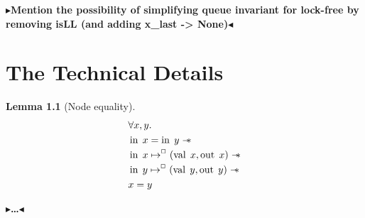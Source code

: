 \documentclass[a4paper, 11pt]{report}
\newtheorem{lemma}[theorem]{Lemma}
\newtheorem{definition}{Definition}[section]
\newcommand{\nIn}[1]{\operatorname{in} \; #1}
\newcommand{\nVal}[1]{\operatorname{val} \; #1}
\newcommand{\nOut}[1]{\operatorname{out} \; #1}
\newcommand{\isNode}[1]{\nIn{#1} \mapsto^{\persistently} (\nVal{#1}, \nOut{#1})}
\newcommand{\todo}[1]{{\color[rgb]{.5,0,0}\textbf{$\blacktriangleright$#1$\blacktriangleleft$}}}
\begin{document}
\todo{Mention the possibility of simplifying queue invariant for lock-free by removing isLL (and adding x\_last -> None)}


\cleardoublepage
{}




\cleardoublepage
\appendix
\chapter{The Technical Details}

\begin{lemma}[Node equality]\label{lemma:nIn-equal}
  \begin{align*}
    &\All x, y.\\
    &\nIn{x} = \nIn{y} \wand\\
    &\isNode{x} \wand\\
    &\isNode{y} \wand\\
    &x = y
  \end{align*}
\end{lemma}


\todo{\dots}
\end{document}
